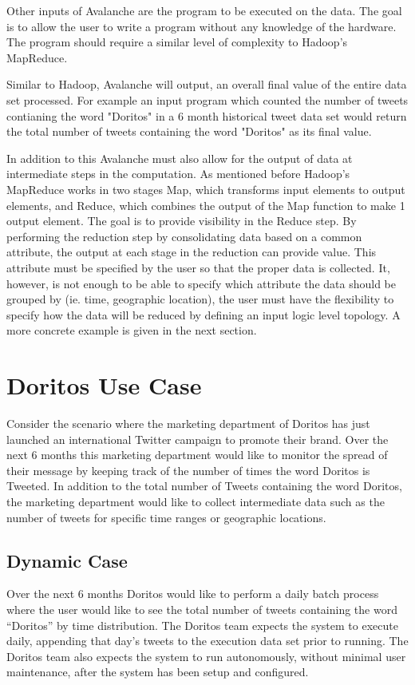 \documentclass[a4paper]{article}
\begin{document}
Other inputs of Avalanche are the program to be executed on the data.  The goal is to allow the user to write a program without any knowledge of the hardware.  The program should require a similar level of complexity to Hadoop's MapReduce.

Similar to Hadoop, Avalanche will output, an overall final value of the entire data set processed.  For example an input program which counted the number of tweets contianing the word "Doritos" in a 6 month historical tweet data set would return the total number of tweets containing the word "Doritos" as its final value.  

In addition to this Avalanche must also allow for the output of data at intermediate steps in the computation.  As mentioned before Hadoop's MapReduce works in two stages Map, which transforms input elements to output elements, and Reduce, which combines the output of the Map function to make 1 output element.  The goal is to provide visibility in the Reduce step.  By performing the reduction step by consolidating data based on a common attribute, the output at each stage in the reduction can provide value.  This attribute must be specified by the user so that the proper data is collected.  It, however, is not enough to be able to specify which attribute the data should be grouped by (ie. time, geographic location), the user must have the flexibility to specify how the data will be reduced by defining an input logic level topology.  A more concrete example is given in the next section.

\section{Doritos Use Case}
Consider the scenario where the marketing department of Doritos has just launched an international Twitter campaign to promote their brand.  Over the next 6 months this marketing department would like to monitor the spread of their message by keeping track of the number of times the word Doritos is Tweeted.  In addition to the total number of Tweets containing the word Doritos, the marketing department would like to collect intermediate data such as the number of tweets for specific time ranges or geographic locations.  

\subsection{Dynamic Case}
Over the next 6 months Doritos would like to perform a daily batch process where the user would like to see the total number of tweets containing the word “Doritos” by time distribution.  The Doritos team expects the system to execute daily, appending that day’s tweets to the execution data set prior to running.  The Doritos team also expects the system to run autonomously, without minimal user maintenance, after the system has been setup and configured.
\end{document}

